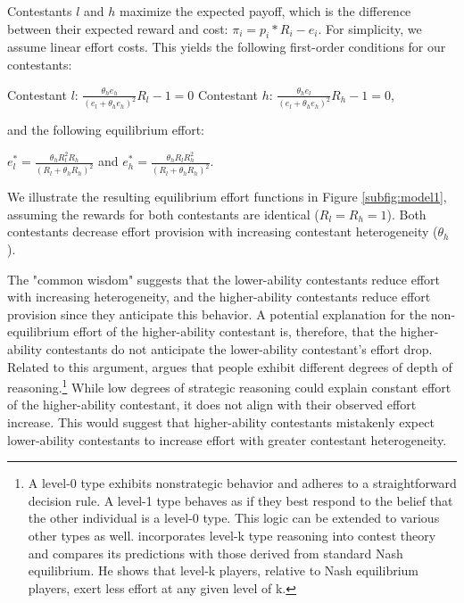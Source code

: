 \documentclass[11pt,a4paper]{article}
\begin{document}
Contestants $l$ and $h$ maximize the expected payoff, which is the difference between their expected reward and cost: $ \pi_i = p_i*R_i - e_i$. For simplicity, we assume linear effort costs. This yields the following first-order conditions for our contestants:

\begin{center}

Contestant $l$: $\frac{\theta_h e_h}{(e_l + \theta_h e_h)^2} R_l - 1 = 0$ \hspace{3 em} Contestant $h$: $\frac{\theta_h e_l}{(e_l + \theta_h e_h)^2} R_h - 1 = 0$,
    
\end{center}

\noindent
and the following equilibrium effort:

\begin{center}
    $e_l^* = \frac{\theta_h R_l^2R_h}{(R_l + \theta_hR_h)^2} $ and $e_h^* = \frac{\theta_h R_lR_h^2}{(R_l + \theta_hR_h)^2} $.
\end{center}

We illustrate the resulting equilibrium effort functions in Figure \ref{subfig:model1}, assuming the rewards for both contestants are identical ($R_l = R_h = 1$). Both contestants decrease effort provision with increasing contestant heterogeneity ($\theta_h$). \par

The "common wisdom" suggests that the lower-ability contestants reduce effort with increasing heterogeneity, and the higher-ability contestants reduce effort provision since they anticipate this behavior. A potential explanation for the non-equilibrium effort of the higher-ability contestant is, therefore, that the higher-ability contestants do not anticipate the lower-ability contestant's effort drop. Related to this argument,  argues that people exhibit different degrees of depth of reasoning.\footnote{A level-0 type exhibits nonstrategic behavior and adheres to a straightforward decision rule. A level-1 type behaves as if they best respond to the belief that the other individual is a level-0 type. This logic can be extended to various other types as well.  incorporates level-k type reasoning into contest theory and compares its predictions with those derived from standard Nash equilibrium. He shows that level-k players, relative to Nash equilibrium players, exert less effort at any given level of k.} While low degrees of strategic reasoning could explain constant effort of the higher-ability contestant, it does not align with their observed effort increase. This would suggest that higher-ability contestants mistakenly expect lower-ability contestants to increase effort with greater contestant heterogeneity.\par
\end{document}
